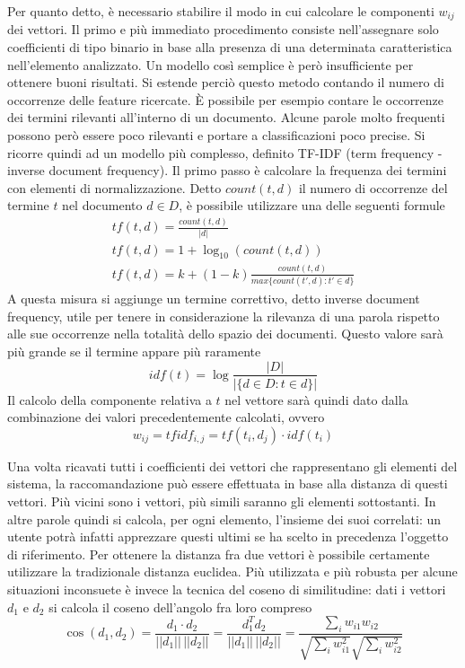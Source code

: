 \documentclass[Lau,binding=0.6cm,noexaminfo,oneside]{sapthesis}
\begin{document}
Per quanto detto, è necessario stabilire il modo in cui calcolare le componenti $w_{ij}$ dei vettori. Il primo e più immediato procedimento consiste nell'assegnare solo coefficienti di tipo binario in base alla presenza di una determinata caratteristica nell'elemento analizzato. Un modello così semplice è però insufficiente per ottenere buoni risultati. Si estende perciò questo metodo contando il numero di occorrenze delle feature ricercate.
\MakeUppercase{è} possibile per esempio contare le occorrenze dei termini rilevanti all'interno di un documento. Alcune parole molto frequenti possono però essere poco rilevanti e portare a classificazioni poco precise. Si ricorre quindi ad un modello più complesso, definito TF-IDF (term frequency - inverse document frequency). Il primo passo è calcolare la frequenza dei termini con elementi di normalizzazione. Detto $count(t,d)$ il numero di occorrenze del termine $t$ nel documento $d \in D$, è possibile utilizzare una delle seguenti formule
\begin{gather*}
  t\!f(t,d) = \frac{count(t,d)}{|d|} \\
  t\!f(t,d) = 1 + \log_{10}(count(t,d)) \\
  t\!f(t,d) = k + (1-k) \frac{count(t,d)}{max\{count(t',d) : t' \in d\}}
\end{gather*}
A questa misura si aggiunge un termine correttivo, detto inverse document frequency, utile per tenere in considerazione la rilevanza di una parola rispetto alle sue occorrenze nella totalità dello spazio dei documenti. Questo valore sarà più grande se il termine appare più raramente
\[
idf(t) = \log \frac{|D|}{|\{d \in D : t \in d\}|}
\]
Il calcolo della componente relativa a $t$ nel vettore sarà quindi dato dalla combinazione dei valori precedentemente calcolati, ovvero
\[
w_{ij} = t\!fidf_{i,j} = t\!f(t_i,d_j) \cdot idf(t_i)
\]

\medskip

Una volta ricavati tutti i coefficienti dei vettori che rappresentano gli elementi del sistema, la raccomandazione può essere effettuata in base alla distanza di questi vettori. Più vicini sono i vettori, più simili saranno gli elementi sottostanti. In altre parole quindi si calcola, per ogni elemento, l'insieme dei suoi correlati: un utente potrà infatti apprezzare questi ultimi se ha scelto in precedenza l'oggetto di riferimento. Per ottenere la distanza fra due vettori è possibile certamente utilizzare la tradizionale distanza euclidea. Più utilizzata e più robusta per alcune situazioni inconsuete è invece la tecnica del coseno di similitudine: dati i vettori $d_1$ e $d_2$ si calcola il coseno dell'angolo fra loro compreso
\[
\cos(d_1, d_2) = \frac{d_1 \cdot d_2}{||d_1|| \, ||d_2||} = \frac{d_1^T d_2}{||d_1|| \, ||d_2||} = \frac{\sum_{i} w_{i1} w_{i2}}{\sqrt{\sum_{i} w_{i1}^2} \sqrt{\sum_{i} w_{i2}^2}}
\]
\end{document}
